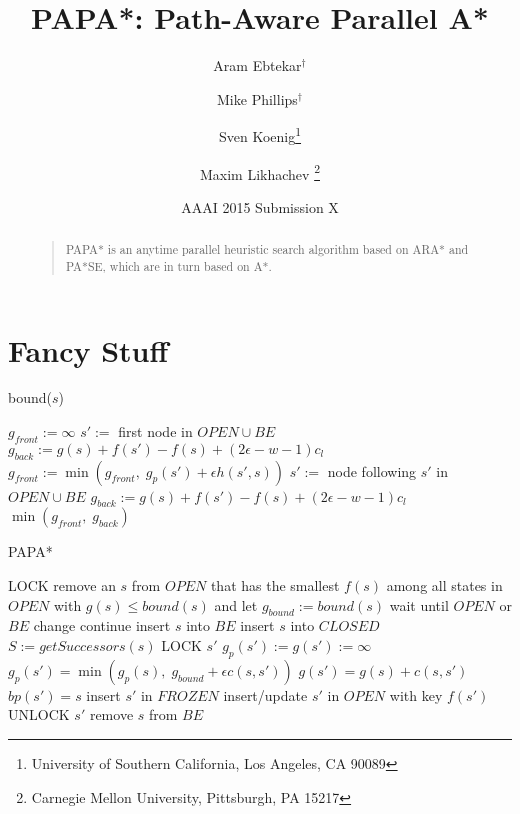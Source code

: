 \documentclass[letterpaper]{article}
\begin{document}
%
\title{PAPA*: Path-Aware Parallel A*}
\author{Aram Ebtekar$^\dagger$ \and Mike Phillips$^\dagger$ \and Sven Koenig\thanks{University of Southern California, Los Angeles, CA 90089} \and Maxim Likhachev%
\thanks{Carnegie Mellon University, Pittsburgh, PA 15217}%
%
}
\author{AAAI 2015 Submission X}%
\maketitle
\begin{abstract}
\begin{quote}
PAPA* is an anytime parallel heuristic search algorithm based on ARA* and PA*SE, which are in turn based on A*.
\end{quote}
\end{abstract}

\section{Fancy Stuff}

\begin{algorithm}
\caption{bound($s$)}
\label{alg:bound}
\begin{algorithmic}
\STATE $g_{front} := \infty$
\STATE $s' :=$ first node in $OPEN \cup BE$
\STATE $g_{back} := g(s) + f(s') - f(s) + (2\epsilon-w-1) c_l$
\STATE $g_{front} := \min(g_{front},\;g_p(s') + \epsilon h(s',s))$
\STATE $s' :=$ node following $s'$ in $OPEN \cup BE$
\STATE $g_{back} := g(s) + f(s') - f(s) + (2\epsilon-w-1) c_l$
\ENDWHILE
\RETURN $\min(g_{front},\;g_{back})$
\end{algorithmic}
\end{algorithm}

\begin{algorithm}
\caption{PAPA*}
\label{alg:PAPA*}
\begin{algorithmic}
\STATE LOCK
\STATE remove an $s$ from $OPEN$ that has the smallest $f(s)$ among all states in $OPEN$ with $g(s) \le bound(s)$ and let $g_{bound} := bound(s)$
\STATE wait until $OPEN$ or $BE$ change
\STATE continue
\ENDIF
\STATE insert $s$ into $BE$
\STATE insert $s$ into $CLOSED$
\STATE $S := getSuccessors(s)$
\STATE LOCK $s'$
\STATE $g_p(s') := g(s') := \infty$
\ENDIF
\STATE $g_p(s') = \min(g_p(s),\; g_{bound} + \epsilon c(s,s'))$
\STATE $g(s') = g(s) + c(s,s')$
\STATE $bp(s') = s$
\STATE insert $s'$ in $FROZEN$
\ELSE
\STATE insert/update $s'$ in $OPEN$ with key $f(s')$
\ENDIF
\ENDIF
\STATE UNLOCK $s'$
\ENDFOR
\STATE remove $s$ from $BE$
\ENDWHILE
\end{algorithmic}
\end{algorithm}
\end{document}
